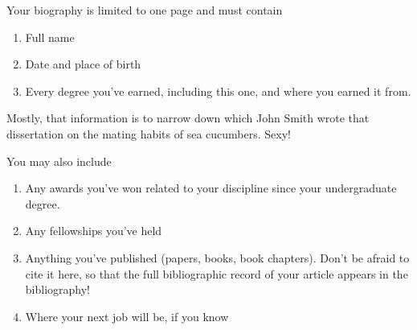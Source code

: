 \biography
Your biography is limited to one page and must contain
\begin{enumerate}
\normalbaselines
\item Full name
\item Date and place of birth
\item Every degree you've earned, including this one, and where you earned it
      from.
\end{enumerate}
Mostly, that information is to narrow down which John Smith wrote that
dissertation on the mating habits of sea cucumbers.  Sexy!

You may also include
\begin{enumerate}
\item Any awards you've won related to your discipline since your
undergraduate degree.
\item Any fellowships you've held
\item Anything you've published (papers, books, book chapters).  Don't be
afraid to cite it here, so that the full bibliographic record of your
article appears in the bibliography!
\item Where your next job will be, if you know
\end{enumerate}



